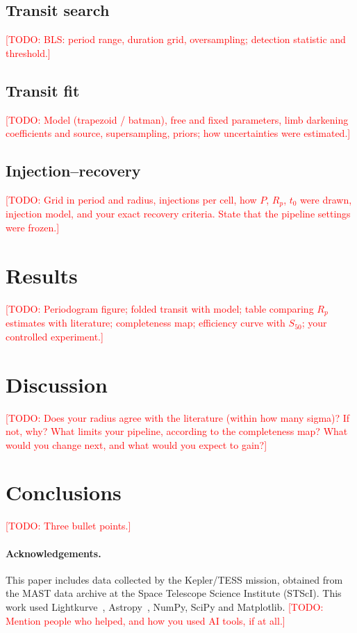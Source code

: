 \documentclass[11pt,a4paper]{article}
\newcommand{\todo}[1]{\textcolor{red}{[TODO: #1]}}
\begin{document}
\subsection{Transit search}
\todo{BLS: period range, duration grid, oversampling; detection statistic and threshold.}
\subsection{Transit fit}
\todo{Model (trapezoid / batman), free and fixed parameters, limb darkening coefficients and
source, supersampling, priors; how uncertainties were estimated.}
\subsection{Injection--recovery}
\todo{Grid in period and radius, injections per cell, how $P$, $R_p$, $t_0$ were drawn,
injection model, and your exact recovery criteria. State that the pipeline settings were frozen.}

\section{Results}
\todo{Periodogram figure; folded transit with model; table comparing $R_p$ estimates with
literature; completeness map; efficiency curve with $S_{50}$; your controlled experiment.}

\section{Discussion}
\todo{Does your radius agree with the literature (within how many sigma)? If not, why?
What limits your pipeline, according to the completeness map? What would you change next,
and what would you expect to gain?}

\section{Conclusions}
\todo{Three bullet points.}

\paragraph{Acknowledgements.} This paper includes data collected by the Kepler/TESS mission,
obtained from the MAST data archive at the Space Telescope Science Institute (STScI).
This work used Lightkurve~\citep{Lightkurve2018}, Astropy~\citep{Astropy2022}, NumPy, SciPy and Matplotlib.
\todo{Mention people who helped, and how you used AI tools, if at all.}


\end{document}
